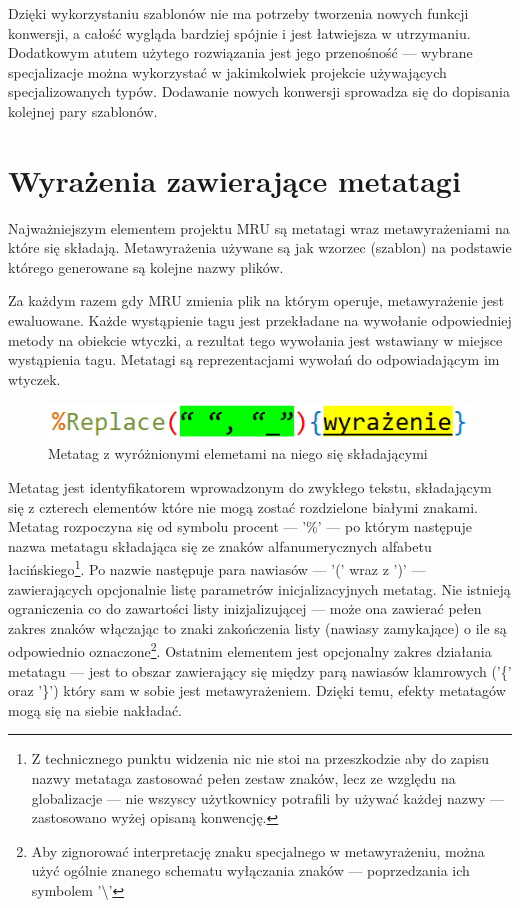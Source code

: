 \par
Dzięki wykorzystaniu szablonów nie ma potrzeby tworzenia nowych funkcji konwersji, a całość wygląda bardziej spójnie i jest łatwiejsza w utrzymaniu. Dodatkowym atutem użytego rozwiązania jest jego przenośność --- wybrane specjalizacje można wykorzystać w jakimkolwiek projekcie używających specjalizowanych typów. Dodawanie nowych konwersji sprowadza się do dopisania kolejnej pary szablonów.

\section{Wyrażenia zawierające metatagi}
Najważniejszym elementem projektu MRU są metatagi wraz metawyrażeniami na które się składają.
Metawyrażenia używane są jak wzorzec (szablon) na podstawie którego generowane są kolejne nazwy plików.

\par
Za każdym razem gdy MRU zmienia plik na którym operuje, metawyrażenie jest ewaluowane. Każde wystąpienie tagu jest przekładane na wywołanie odpowiedniej metody na obiekcie wtyczki, a rezultat tego wywołania jest wstawiany w miejsce wystąpienia tagu.
Metatagi są reprezentacjami wywołań do odpowiadającym im wtyczek.

\begin{figure}
\begin{center}
\includegraphics[scale=0.50]{img/metatag_sample.png}
\end{center}
\caption{Metatag z wyróżnionymi elemetami na niego się składającymi}
\end{figure}

\par
Metatag jest identyfikatorem wprowadzonym do zwykłego tekstu, składającym się z czterech elementów które nie mogą zostać rozdzielone białymi znakami. Metatag rozpoczyna się od symbolu procent --- '\%' --- po którym następuje nazwa metatagu składająca się ze znaków alfanumerycznych alfabetu łacińskiego\footnote{Z technicznego punktu widzenia nic nie stoi na przeszkodzie aby do zapisu nazwy metataga zastosować pełen zestaw znaków, lecz ze względu na globalizacje --- nie wszyscy użytkownicy potrafili by używać każdej nazwy --- zastosowano wyżej opisaną konwencję.}.
Po nazwie następuje para nawiasów --- '(' wraz z ')' --- zawierających opcjonalnie listę parametrów inicjalizacyjnych metatag. Nie istnieją ograniczenia co do zawartości listy inizjalizującej --- może ona zawierać pełen zakres znaków włączając to znaki zakończenia listy (nawiasy zamykające) o ile są odpowiednio oznaczone\footnote{Aby zignorować interpretację znaku specjalnego w metawyrażeniu, można użyć ogólnie znanego schematu wyłączania znaków --- poprzedzania ich symbolem '\textbackslash'}.
Ostatnim elementem jest opcjonalny zakres działania metatagu --- jest to obszar zawierający się między parą nawiasów klamrowych ('\{' oraz '\}') który sam w sobie jest metawyrażeniem. Dzięki temu, efekty metatagów mogą się na siebie nakładać.

